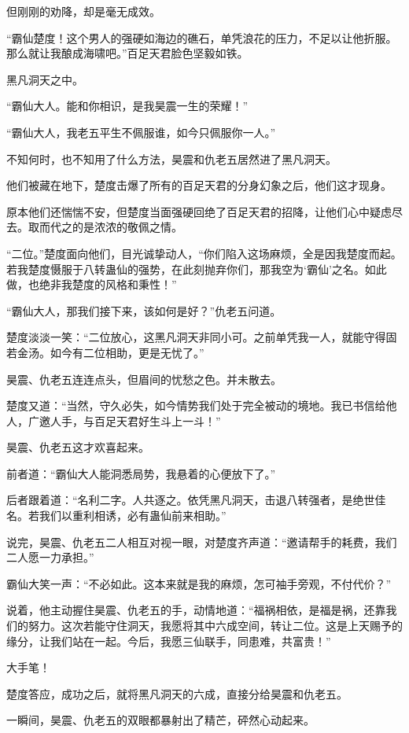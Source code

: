 \begin{this_body}
但刚刚的劝降，却是毫无成效。

“霸仙楚度！这个男人的强硬如海边的礁石，单凭浪花的压力，不足以让他折服。那么就让我酿成海啸吧。”百足天君脸色坚毅如铁。

黑凡洞天之中。

“霸仙大人。能和你相识，是我昊震一生的荣耀！”

“霸仙大人，我老五平生不佩服谁，如今只佩服你一人。”

不知何时，也不知用了什么方法，昊震和仇老五居然进了黑凡洞天。

他们被藏在地下，楚度击爆了所有的百足天君的分身幻象之后，他们这才现身。

原本他们还惴惴不安，但楚度当面强硬回绝了百足天君的招降，让他们心中疑虑尽去。取而代之的是浓浓的敬佩之情。

“二位。”楚度面向他们，目光诚挚动人，“你们陷入这场麻烦，全是因我楚度而起。若我楚度慑服于八转蛊仙的强势，在此刻抛弃你们，那我空为‘霸仙’之名。如此做，也绝非我楚度的风格和秉性！”

“霸仙大人，那我们接下来，该如何是好？”仇老五问道。

楚度淡淡一笑：“二位放心，这黑凡洞天非同小可。之前单凭我一人，就能守得固若金汤。如今有二位相助，更是无忧了。”

昊震、仇老五连连点头，但眉间的忧愁之色。并未散去。

楚度又道：“当然，守久必失，如今情势我们处于完全被动的境地。我已书信给他人，广邀人手，与百足天君好生斗上一斗！”

昊震、仇老五这才欢喜起来。

前者道：“霸仙大人能洞悉局势，我悬着的心便放下了。”

后者跟着道：“名利二字。人共逐之。依凭黑凡洞天，击退八转强者，是绝世佳名。若我们以重利相诱，必有蛊仙前来相助。”

说完，昊震、仇老五二人相互对视一眼，对楚度齐声道：“邀请帮手的耗费，我们二人愿一力承担。”

霸仙大笑一声：“不必如此。这本来就是我的麻烦，怎可袖手旁观，不付代价？”

说着，他主动握住昊震、仇老五的手，动情地道：“福祸相依，是福是祸，还靠我们的努力。这次若能守住洞天，我愿将其中六成空间，转让二位。这是上天赐予的缘分，让我们站在一起。今后，我愿三仙联手，同患难，共富贵！”

大手笔！

楚度答应，成功之后，就将黑凡洞天的六成，直接分给昊震和仇老五。

一瞬间，昊震、仇老五的双眼都暴射出了精芒，砰然心动起来。


\end{this_body}
